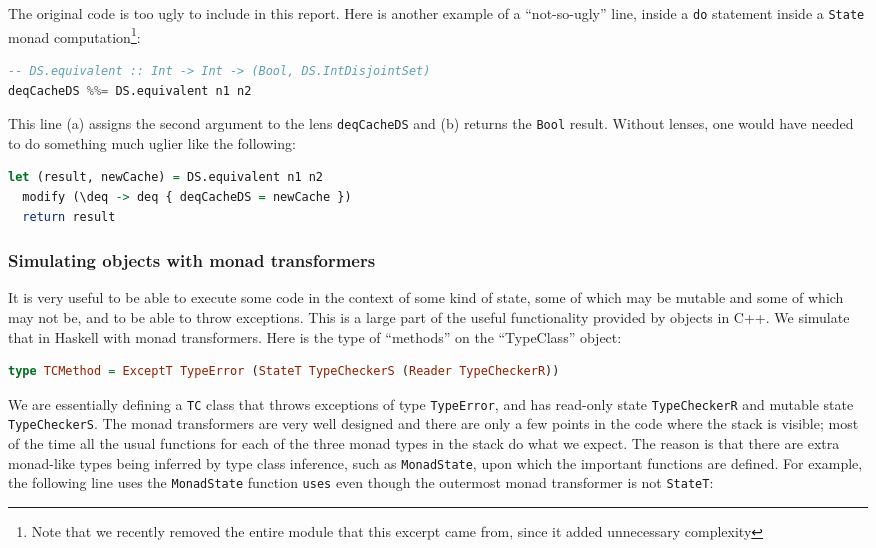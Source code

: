 \documentclass{article}
\begin{document}
\begin{spacing}{1.1}
The original code is too ugly to include in this report. Here is another example of a ``not-so-ugly'' line, inside a \lstinline{do} statement inside a \lstinline{State} monad computation\footnote{Note that we recently removed the entire module that this excerpt came from, since it added unnecessary complexity}:
\begin{lstlisting}[language=Haskell]
-- DS.equivalent :: Int -> Int -> (Bool, DS.IntDisjointSet)
deqCacheDS %%= DS.equivalent n1 n2
\end{lstlisting}
This line (a) assigns the second argument to the lens \lstinline{deqCacheDS} and (b) returns the \lstinline{Bool} result. Without lenses, one would have needed to do something much uglier like the following:
\begin{lstlisting}[language=Haskell]
  let (result, newCache) = DS.equivalent n1 n2
  modify (\deq -> deq { deqCacheDS = newCache })
  return result
\end{lstlisting}

\subsubsection{Simulating objects with monad transformers}

It is very useful to be able to execute some code in the context of some kind of state, some of which may be mutable and some of which may not be, and to be able to throw exceptions. This is a large part of the useful functionality provided by objects in C++. We simulate that in Haskell with monad transformers. Here is the type of ``methods'' on the ``TypeClass'' object:
\begin{lstlisting}[language=Haskell]
type TCMethod = ExceptT TypeError (StateT TypeCheckerS (Reader TypeCheckerR))
\end{lstlisting}

We are essentially defining a \lstinline{TC} class that throws exceptions of type \lstinline{TypeError}, and has read-only state \lstinline{TypeCheckerR} and mutable state \lstinline{TypeCheckerS}. The monad transformers are very well designed and there are only a few points in the code where the stack is visible; most of the time all the usual functions for each of the three monad types in the stack do what we expect. The reason is that there are extra monad-like types being inferred by type class inference, such as \lstinline{MonadState}, upon which the important functions are defined. For example, the following line uses the \lstinline{MonadState} function \lstinline{uses} even though the outermost monad transformer is not \lstinline{StateT}:


\end{spacing}
\end{document}
